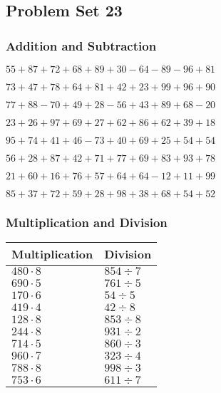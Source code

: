 \hypertarget{problem-set-23}{%
\subsection{Problem Set 23}\label{problem-set-23}}

\hypertarget{addition-and-subtraction}{%
\subsubsection{Addition and
Subtraction}\label{addition-and-subtraction}}

\(55+87+72+68+89+30-64-89-96+81\)

\(73+47+78+64+81+42+23+99+96+90\)

\(77+88-70+49+28-56+43+89+68-20\)

\(23+26+97+69+27+62+86+62+39+18\)

\(95+74+41+46-73+40+69+25+54+54\)

\(56+28+87+42+71+77+69+83+93+78\)

\(21+60+16+76+57+64+64-12+11+99\)

\(85+37+72+59+28+98+38+68+54+52\)

\hypertarget{multiplication-and-division}{%
\subsubsection{Multiplication and
Division}\label{multiplication-and-division}}

\begin{longtable}[]{@{}ll@{}}
\toprule
Multiplication & Division\tabularnewline
\midrule
\endhead
\(480\cdot8\) & \(854÷7\)\tabularnewline
\(690\cdot5\) & \(761÷5\)\tabularnewline
\(170\cdot6\) & \(54÷5\)\tabularnewline
\(419\cdot4\) & \(42÷8\)\tabularnewline
\(128\cdot8\) & \(853÷8\)\tabularnewline
\(244\cdot8\) & \(931÷2\)\tabularnewline
\(714\cdot5\) & \(860÷3\)\tabularnewline
\(960\cdot7\) & \(323÷4\)\tabularnewline
\(788\cdot8\) & \(998÷3\)\tabularnewline
\(753\cdot6\) & \(611÷7\)\tabularnewline
\bottomrule
\end{longtable}
